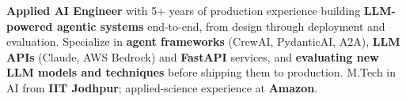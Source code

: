 \documentclass[letter,10pt]{article}
\begin{document}

\textbf{Applied AI Engineer} with 5+ years of production experience building \textbf{LLM-powered agentic systems} end-to-end, from design through deployment and evaluation.
Specialize in \textbf{agent frameworks} (CrewAI, PydanticAI, A2A), \textbf{LLM APIs} (Claude, AWS Bedrock) and \textbf{FastAPI} services, and \textbf{evaluating new LLM models and techniques} before shipping them to production.
M.Tech in AI from \textbf{IIT Jodhpur}; applied-science experience at \textbf{Amazon}.
\end{document}
